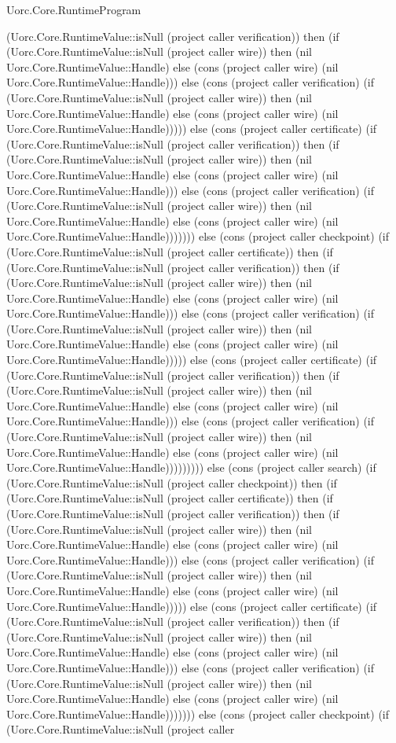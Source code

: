 \begin{lexlean}{Uorc.Core.RuntimeProgram}
\begin{semanticmodule}
{(Uorc.Core.RuntimeValue::isNull (project caller verification)) then (if (Uorc.Core.RuntimeValue::isNull (project caller wire)) then (nil Uorc.Core.RuntimeValue::Handle) else (cons (project caller wire) (nil Uorc.Core.RuntimeValue::Handle))) else (cons (project caller verification) (if (Uorc.Core.RuntimeValue::isNull (project caller wire)) then (nil Uorc.Core.RuntimeValue::Handle) else (cons (project caller wire) (nil Uorc.Core.RuntimeValue::Handle))))) else (cons (project caller certificate) (if (Uorc.Core.RuntimeValue::isNull (project caller verification)) then (if (Uorc.Core.RuntimeValue::isNull (project caller wire)) then (nil Uorc.Core.RuntimeValue::Handle) else (cons (project caller wire) (nil Uorc.Core.RuntimeValue::Handle))) else (cons (project caller verification) (if (Uorc.Core.RuntimeValue::isNull (project caller wire)) then (nil Uorc.Core.RuntimeValue::Handle) else (cons (project caller wire) (nil Uorc.Core.RuntimeValue::Handle))))))) else (cons (project caller checkpoint) (if (Uorc.Core.RuntimeValue::isNull (project caller certificate)) then (if (Uorc.Core.RuntimeValue::isNull (project caller verification)) then (if (Uorc.Core.RuntimeValue::isNull (project caller wire)) then (nil Uorc.Core.RuntimeValue::Handle) else (cons (project caller wire) (nil Uorc.Core.RuntimeValue::Handle))) else (cons (project caller verification) (if (Uorc.Core.RuntimeValue::isNull (project caller wire)) then (nil Uorc.Core.RuntimeValue::Handle) else (cons (project caller wire) (nil Uorc.Core.RuntimeValue::Handle))))) else (cons (project caller certificate) (if (Uorc.Core.RuntimeValue::isNull (project caller verification)) then (if (Uorc.Core.RuntimeValue::isNull (project caller wire)) then (nil Uorc.Core.RuntimeValue::Handle) else (cons (project caller wire) (nil Uorc.Core.RuntimeValue::Handle))) else (cons (project caller verification) (if (Uorc.Core.RuntimeValue::isNull (project caller wire)) then (nil Uorc.Core.RuntimeValue::Handle) else (cons (project caller wire) (nil Uorc.Core.RuntimeValue::Handle))))))))) else (cons (project caller search) (if (Uorc.Core.RuntimeValue::isNull (project caller checkpoint)) then (if (Uorc.Core.RuntimeValue::isNull (project caller certificate)) then (if (Uorc.Core.RuntimeValue::isNull (project caller verification)) then (if (Uorc.Core.RuntimeValue::isNull (project caller wire)) then (nil Uorc.Core.RuntimeValue::Handle) else (cons (project caller wire) (nil Uorc.Core.RuntimeValue::Handle))) else (cons (project caller verification) (if (Uorc.Core.RuntimeValue::isNull (project caller wire)) then (nil Uorc.Core.RuntimeValue::Handle) else (cons (project caller wire) (nil Uorc.Core.RuntimeValue::Handle))))) else (cons (project caller certificate) (if (Uorc.Core.RuntimeValue::isNull (project caller verification)) then (if (Uorc.Core.RuntimeValue::isNull (project caller wire)) then (nil Uorc.Core.RuntimeValue::Handle) else (cons (project caller wire) (nil Uorc.Core.RuntimeValue::Handle))) else (cons (project caller verification) (if (Uorc.Core.RuntimeValue::isNull (project caller wire)) then (nil Uorc.Core.RuntimeValue::Handle) else (cons (project caller wire) (nil Uorc.Core.RuntimeValue::Handle))))))) else (cons (project caller checkpoint) (if (Uorc.Core.RuntimeValue::isNull (project caller }
\end{semanticmodule}
\end{lexlean}
